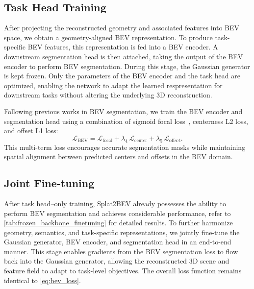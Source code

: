 \subsection{Task Head Training}
\label{subsec:task_head}
After projecting the reconstructed geometry and associated features into BEV space, we obtain a geometry-aligned BEV representation.
To produce task-specific BEV features, this representation is fed into a BEV encoder.
A downstream segmentation head is then attached, taking the output of the BEV encoder to perform BEV segmentation.
During this stage, the Gaussian generator is kept frozen. Only the parameters of the BEV encoder and the task head are optimized, enabling the network to adapt the learned respresentation for downstream tasks without altering the underlying 3D reconstruction.

Following previous works in BEV segmentation, we train the BEV encoder and segmentation head using a combination of sigmoid focal loss~\cite{lin2017focal}, centerness L2 loss, and offset L1 loss:
\begin{equation}
    \mathcal{L}_{\text{BEV}} = \mathcal{L}_{\text{focal}} + \lambda_4 \, \mathcal{L}_{\text{center}} + \lambda_5 \, \mathcal{L}_{\text{offset}}.
    \label{eq:bev_loss}
\end{equation}
This multi-term loss encourages accurate segmentation masks while maintaining spatial alignment between predicted centers and offsets in the BEV domain.

\subsection{Joint Fine-tuning}
\label{subsec:joint_finetuning}
After task head–only training, Splat2BEV already possesses the ability to perform BEV segmentation and achieves considerable performance, refer to \cref{tab:frozen_backbone_finetuning} for detailed results.
To further harmonize geometry, semantics, and task-specific representations, we jointly fine-tune the Gaussian generator, BEV encoder, and segmentation head in an end-to-end manner.
This stage enables gradients from the BEV segmentation loss to flow back into the Gaussian generator, allowing the reconstructed 3D scene and feature field to adapt to task-level objectives. 
The overall loss function remains identical to \cref{eq:bev_loss}.
